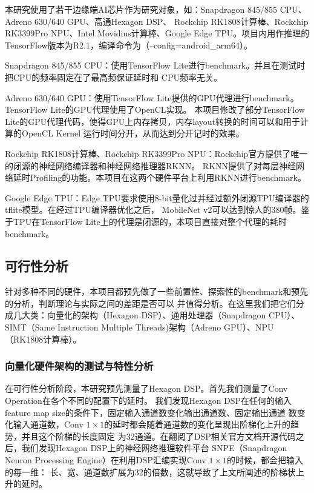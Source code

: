 本研究使用了若干边缘端AI芯片作为研究对象，如：Snapdragon 845/855 CPU、Adreno 630/640 GPU、高通Hexagon DSP、
Rockchip RK1808计算棒、Rockchip RK3399Pro NPU、Intel Movidius计算棒、Google Edge TPU。项目内用作推理的
TensorFlow版本为R2.1，编译命令为（--config=android\_arm64）。

Snapdragon 845/855 CPU：使用TensorFlow Lite进行benchmark。并且在测试时把CPU的频率固定在了最高频保证延时和
CPU频率无关。

Adreno 630/640 GPU：使用TensorFlow Lite提供的GPU代理进行benchmark。TensorFlow Lite的GPU代理使用了OpenCL实现。
本项目修改了部分TensorFlow Lite的GPU代理代码，使得GPU上内存拷贝，内存layout转换的时间可以和用于计算的OpenCL Kernel
运行时间分开，从而达到分开记时的效果。

Rockchip RK1808计算棒、Rockchip RK3399Pro NPU：Rockchip官方提供了唯一的闭源的神经网络编译器和神经网络推理器RKNN。
RKNN提供了对每层神经网络延时Profiling的功能。本项目在这两个硬件平台上利用RKNN进行benchmark。

Google Edge TPU：Edge TPU要求使用8-bit量化过并经过额外闭源TPU编译器的tflite模型。在经过TPU编译器优化之后，
MobileNet v2可以达到惊人的380帧。鉴于TPU在TensorFlow Lite上的代理是闭源的，本项目直接对整个代理的耗时benchmark。

\subsection{可行性分析}

针对多种不同的硬件，本项目都预先做了一些前置性、探索性的benchmark和预先的分析，判断理论与实际之间的差距是否可以
并值得分析。在这里我们把它们分成几大类：向量化的架构（Hexagon DSP）、通用处理器（Snapdragon CPU）、
SIMT（Same Instruction Multiple Threads)架构（Adreno GPU）、NPU（RK1808计算棒）。

\subsubsection{向量化硬件架构的测试与特性分析}

在可行性分析阶段，本研究预先测量了Hexagon DSP。首先我们测量了Conv Operation在各个不同的配置下的延时。
我们发现Hexagon DSP在任何的输入feature map size的条件下，固定输入通道数变化输出通道数、固定输出通道
数变化输入通道数，Conv $1\times 1$的延时都会随着通道数的变化呈现出阶梯化上升的趋势，并且这个阶梯的长度固定
为32通道。在翻阅了DSP相关官方文档开源代码之后，我们发现Hexagon DSP上的神经网络推理软件平台
SNPE（Snapdragon Neuron Processing Engine）在利用DSP汇编实现Conv $1\times 1$的时候，都会把输入的每一维：
长、宽、通道数扩展为32的倍数，这就导致了上文所阐述的阶梯状上升的延时。

